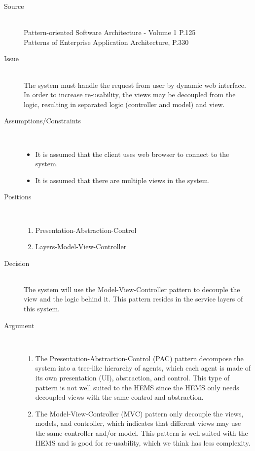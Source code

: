 \begin{description}
\item [Source]~\\
Pattern-oriented Software Architecture - Volume 1 P.125 \cite{wiley-1}\\
Patterns of Enterprise Application Architecture, P.330 \cite{Fowler:2002:PEA:579257}

\item [Issue]~\\
The system must handle the request from user by dynamic web interface. In order to increase re-usability, the views may be decoupled from the logic, resulting in separated logic (controller and model) and view.

\item [Assumptions/Constraints]~
\begin{itemize}
\item It is assumed that the client uses web browser to connect to the system.
\item It is assumed that there are multiple views in the system.
\end{itemize}


\item [Positions]~
\begin{enumerate}
\item Presentation-Abstraction-Control
\item Layers-Model-View-Controller
\end{enumerate}


\item [Decision] ~\\
The system will use the Model-View-Controller pattern to decouple the view and the logic behind it. This pattern resides in the service layers of this system.

\item [Argument]~
\begin{enumerate}
\item The Presentation-Abstraction-Control (PAC) pattern decompose the system into a tree-like hierarchy of agents, which each agent is made of its own presentation (UI), abstraction, and control. This type of pattern is not well suited to the HEMS since the HEMS only needs decoupled views with the same control and abstraction.

\item The Model-View-Controller (MVC) pattern only decouple the views, models, and controller, which indicates that different views may use the same controller and/or model. This pattern is well-suited with the HEMS and is good for re-usability, which we think has less complexity.


\end{enumerate}
\end{description}
